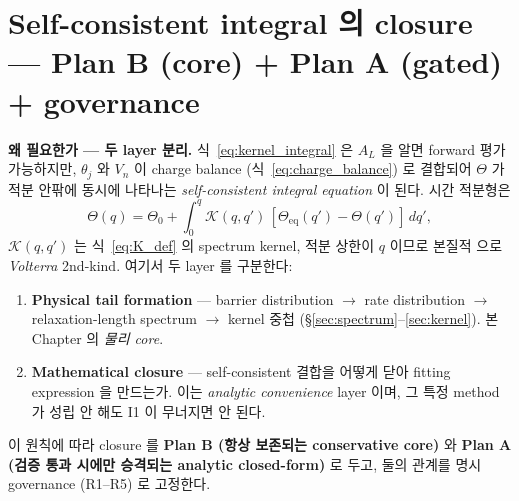 \documentclass[11pt,a4paper]{article}
\newcommand{\eq}{\mathrm{eq}}
\begin{document}
\section{Self-consistent integral 의 closure — Plan B (core) + Plan A (gated) + governance}\label{sec:closure}
\textbf{왜 필요한가 — 두 layer 분리.} 식~\eqref{eq:kernel_integral} 은 $A_L$ 을 알면
forward 평가 가능하지만, $\theta_j$ 와 $V_n$ 이 charge balance (식~\eqref{eq:charge_balance})
로 결합되어 $\Theta$ 가 적분 안팎에 동시에 나타나는 \emph{self-consistent integral equation}
이 된다. 시간 적분형은
\begin{equation}
\Theta(q)=\Theta_0+\int_0^q \mathcal K(q,q')\,[\Theta_\eq(q')-\Theta(q')]\,dq',
\label{eq:volterra_self}
\end{equation}
$\mathcal K(q,q')$ 는 식~\eqref{eq:K_def} 의 spectrum kernel, 적분 상한이 $q$ 이므로 본질적
으로 \emph{Volterra} 2nd-kind. 여기서 두 layer 를 구분한다:
\begin{enumerate}[label=\textbf{I\arabic*.}]
\item \textbf{Physical tail formation} — barrier distribution $\to$ rate distribution $\to$
  relaxation-length spectrum $\to$ kernel 중첩 (\S\ref{sec:spectrum}--\ref{sec:kernel}). 본
  Chapter 의 \emph{물리 core}.
\item \textbf{Mathematical closure} — self-consistent 결합을 어떻게 닫아 fitting expression
  을 만드는가. 이는 \emph{analytic convenience} layer 이며, 그 특정 method 가 성립 안 해도
  I1 이 무너지면 안 된다.
\end{enumerate}
이 원칙에 따라 closure 를 \textbf{Plan B (항상 보존되는 conservative core)} 와
\textbf{Plan A (검증 통과 시에만 승격되는 analytic closed-form)} 로 두고, 둘의 관계를 명시
governance (R1--R5) 로 고정한다.
\end{document}
